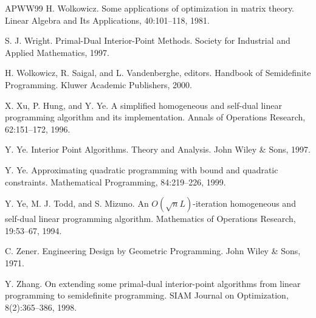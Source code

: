 \begin{thebibliography}{APWW99}
 H. Wolkowicz. Some applications of optimization in matrix theory. Linear Algebra and Its Applications, 40:101–118, 1981.

 S. J. Wright. Primal-Dual Interior-Point Methods. Society for Industrial and Applied Mathematics, 1997.

 H. Wolkowicz, R. Saigal, and L. Vandenberghe, editors. Handbook of Semidefinite Programming. Kluwer Academic Publishers, 2000.

 X. Xu, P. Hung, and Y. Ye. A simplified homogeneous and self-dual linear programming algorithm and its implementation. Annals of Operations Research, 62:151–172, 1996.

 Y. Ye. Interior Point Algorithms. Theory and Analysis. John Wiley \& Sons, 1997.

 Y. Ye. Approximating quadratic programming with bound and quadratic constraints. Mathematical Programming, 84:219–226, 1999.

 Y. Ye, M. J. Todd, and S. Mizuno. An $O(\sqrt{n}L)$-iteration homogeneous and self-dual linear programming algorithm. Mathematics of Operations Research, 19:53–67, 1994.

 C. Zener. Engineering Design by Geometric Programming. John Wiley \& Sons, 1971.

 Y. Zhang. On extending some primal-dual interior-point algorithms from linear programming to semidefinite programming. SIAM Journal on Optimization, 8(2):365–386, 1998.
\end{thebibliography}
\endgroup
